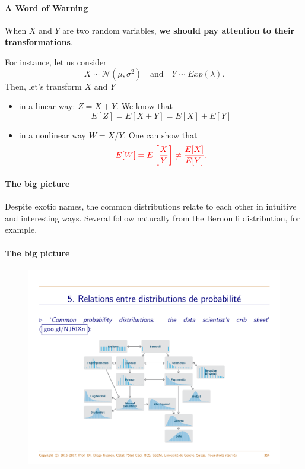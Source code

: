 \documentclass[smaller]{beamer}\usepackage[]{graphicx}\usepackage[]{color}
\begin{document}
\begin{frame}{\secname}
\framesubtitle{A Word of Warning}

  When $X$ and $Y$ are two random variables, \textbf{we should pay attention to their transformations}. \medskip

  For instance, let us consider
  $$
  X\sim \mathcal{N}(\mu,\sigma^2) \quad \text{and}  \quad Y\sim Exp(\lambda).
  $$
  Then, let's transform $X$ and $Y$

  \begin{itemize}
  \item  in a linear way: $Z=X+Y$. We know that
  $$
  E[Z] = E[X+Y] = E[X] + E[Y]
  $$
  \item in a nonlinear way $W = X/Y$. One can show that
  $$\color{red}
  E[W] = E\left[\frac{X}{Y}\right] \neq \frac{E[X]}{E[Y]}. \color{black}
  $$
   \end{itemize}
\end{frame}

\begin{frame}{{\secname}}
  \framesubtitle{The big picture}

  Despite exotic names, the common distributions relate to each other in intuitive and interesting ways. Several follow naturally from the Bernoulli distribution, for example.
\end{frame}


\begin{frame}{{\secname}}
  \framesubtitle{The big picture}

  \begin{figure}[ptb]\centering
  \includegraphics[scale = 0.45]{img/RelRVs_Diego.pdf}%
  \end{figure}
\end{frame}
\end{document}
